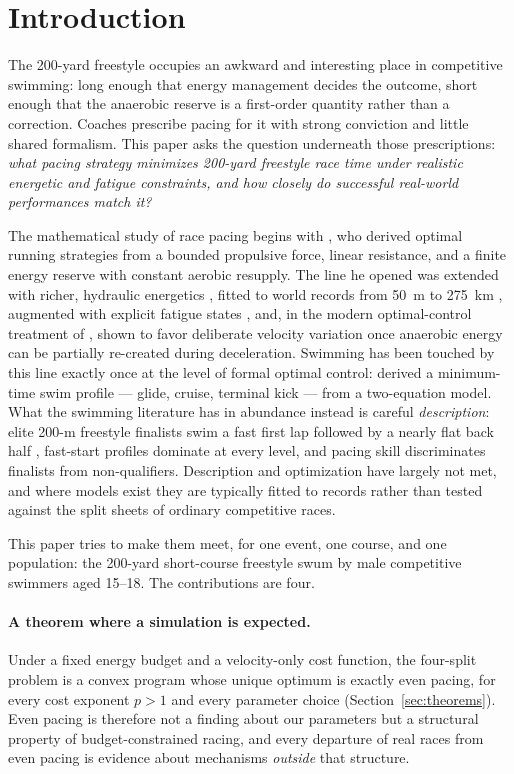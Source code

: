 \section{Introduction}\label{sec:introduction}

The 200-yard freestyle occupies an awkward and interesting place in
competitive swimming: long enough that energy management decides the outcome,
short enough that the anaerobic reserve is a first-order quantity rather than
a correction. Coaches prescribe pacing for it with strong conviction and
little shared formalism. This paper asks the question underneath those
prescriptions: \emph{what pacing strategy minimizes 200-yard freestyle race
time under realistic energetic and fatigue constraints, and how closely do
successful real-world performances match it?}

The mathematical study of race pacing begins with
\citet{keller1973theory,keller1974optimal}, who derived optimal running
strategies from a bounded propulsive force, linear resistance, and a finite
energy reserve with constant aerobic resupply. The line he opened was
extended with richer, hydraulic energetics \citep{behncke1993mathematical},
fitted to world records from 50~m to 275~km \citep{woodside1991optimal},
augmented with explicit fatigue states \citep{mathis1989fatigue}, and, in the
modern optimal-control treatment of \citet{aftalionbonnans2014}, shown to
favor deliberate velocity variation once anaerobic energy can be partially
re-created during deceleration. Swimming has been touched by this line
exactly once at the level of formal optimal control: \citet{maronski1996minimum}
derived a minimum-time swim profile --- glide, cruise, terminal kick --- from
a two-equation model. What the swimming literature has in abundance instead
is careful \emph{description}: elite 200-m freestyle finalists swim a fast
first lap followed by a nearly flat back half \citep{robertson2009analysis},
fast-start profiles dominate at every level, and pacing skill discriminates
finalists from non-qualifiers. Description and optimization have largely not
met, and where models exist they are typically fitted to records rather than
tested against the split sheets of ordinary competitive races.

This paper tries to make them meet, for one event, one course, and one
population: the 200-yard short-course freestyle swum by male competitive
swimmers aged 15--18. The contributions are four.

\paragraph{A theorem where a simulation is expected.} Under a fixed energy
budget and a velocity-only cost function, the four-split problem is a convex
program whose unique optimum is exactly even pacing, for every cost exponent
$p>1$ and every parameter choice (Section~\ref{sec:theorems}). Even pacing is
therefore not a finding about our parameters but a structural property of
budget-constrained racing, and every departure of real races from even pacing
is evidence about mechanisms \emph{outside} that structure.

